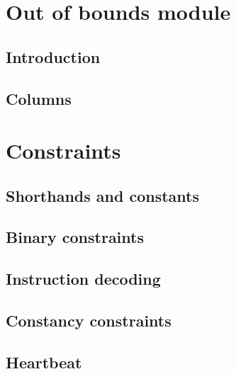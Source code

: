 

\section{Out of bounds module}                    
\subsection{Introduction}                                                                                       \label{oob: intro}
\subsection{Columns}                                                                                          \label{oob: columns}
                                                                                                        
\section{Constraints}                                                                                   
\subsection{Shorthands and constants}                                                                      \label{oob: shorthands}
\subsection{Binary constraints}                                                                                \label{oob: binary}
\subsection{Instruction decoding}                                                                            \label{oob: instruction decoding}
\subsection{Constancy constraints}                                                                        \label{oob: counter-constancies} 
\subsection{Heartbeat}                                                                                      \label{oob: heartbeat}
